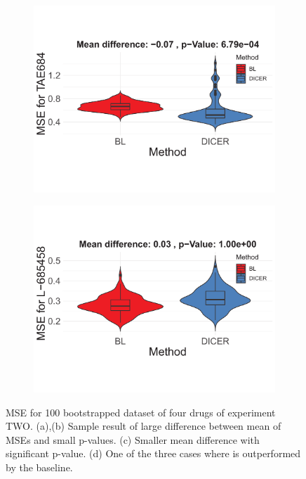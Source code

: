 \begin{figure}
\begin{subfigure}[b]{0.22\textwidth}
		\centering 
		\includegraphics[width=\textwidth]{./img/bar3.pdf}
		\caption{}    
	\end{subfigure}
	\quad
	\begin{subfigure}[b]{0.22\textwidth}   
		\centering 
		\includegraphics[width=\textwidth]{./img/bar4}
		\caption{}    
	\end{subfigure}
	\squeezeup
	\caption{MSE for 100 bootstrapped dataset of four drugs of experiment TWO. (a),(b) Sample result of large difference between mean of MSEs and small p-values. (c) Smaller mean difference with significant p-value. (d) One of the three cases where \dc{} is outperformed by the baseline.} 
	\label{fig:allbars}
	\end{figure}


